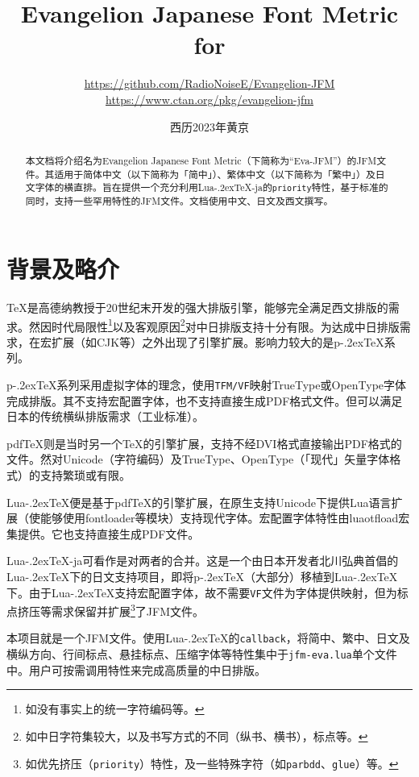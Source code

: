 \documentclass[twoside]{ltjsarticle}
\title{\sffamily\bfseries Evangelion Japanese Font Metric for \LuaTeX}
\author{\large \url{https://github.com/RadioNoiseE/Evangelion-JFM}\\\url{https://www.ctan.org/pkg/evangelion-jfm}}
\date{西历2023年\quad{}黄京}
\def\段{\par}
\def\LuaTeX{Lua\kern-.2ex\TeX}
\def\pTeX{p\kern-.2ex\TeX}
\def\pdfTeX{pdf\TeX}
\begin{document}
\lstset{doubleletterspace = true}
\zw\parskip=2pt
\maketitle

\begin{abstract}
    本文档将介绍名为Evangelion Japanese Font Metric（下简称为``\textsf{Eva-JFM}''）的JFM文件。其适用于简体中文（以下简称为「简中」）、繁体中文（以下简称为「繁中」）及日文字体的横直排。旨在提供一个充分利用\LuaTeX-ja的\texttt{priority}特性，基于标准\cite{jlreq}的同时，支持一些罕用特性的JFM文件。文档使用中文、日文及西文撰写。
\end{abstract}

\tableofcontents

\section{背景及略介}
\TeX{}是高德纳教授于20世纪末开发的强大排版引擎，能够完全满足西文排版的需求。然因时代局限性\footnote{如没有事实上的统一字符编码等。}以及客观原因\footnote{如中日字符集较大，以及书写方式的不同（纵书、横书），标点等。}对中日排版支持十分有限。为达成中日排版需求，在宏扩展（如\textsf{CJK}等）之外出现了引擎扩展。影响力较大的是\pTeX{}系列。\段
\pTeX{}系列采用虚拟字体的理念，使用\texttt{TFM/VF}映射TrueType或OpenType字体完成排版。其不支持宏配置字体，也不支持直接生成PDF格式文件。但可以满足日本的传统横纵排版需求（工业标准）。\段
\pdfTeX{}则是当时另一个\TeX{}的引擎扩展，支持不经DVI格式直接输出PDF格式的文件。然对Unicode（字符编码）及TrueType、OpenType（「现代」矢量字体格式）的支持繁琐或有限。\段
\LuaTeX{}便是基于\pdfTeX{}的引擎扩展，在原生支持Unicode下提供Lua语言扩展（使能够使用\textsf{fontloader}等模块）支持现代字体。宏配置字体特性由\textsf{luaotfload}宏集提供。它也支持直接生成PDF文件。\段
\LuaTeX{}-ja可看作是对两者的合并。这是一个由日本开发者北川弘典首倡的\LuaTeX{}下的日文支持项目，即将\pTeX{}（大部分）移植到\LuaTeX{}下。由于\LuaTeX{}支持宏配置字体，故不需要\texttt{VF}文件为字体提供映射，但为标点挤压等需求保留并扩展\footnote{如优先挤压（\texttt{priority}）特性，及一些特殊字符（如\texttt{parbdd}、\texttt{glue}）等。}了JFM文件。\段
本项目就是一个JFM文件。使用\LuaTeX{}的\texttt{callback}，将简中、繁中、日文及横纵方向、行间标点、悬挂标点、压缩字体等特性集中于\texttt{jfm-eva.lua}单个文件中。用户可按需调用特性来完成高质量的中日排版。
\end{document}
